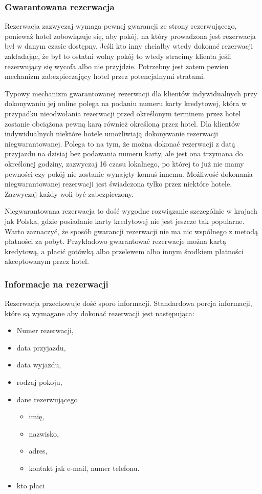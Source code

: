 \documentclass[a4paper,onecolumn,oneside,11pt,wide,floatssmall]{mwrep}
\theoremstyle{definition}
\theoremstyle{plain}%
\theoremstyle{remark}
\begin{document}
\subsubsection{Gwarantowana rezerwacja}
Rezerwacja zazwyczaj wymaga pewnej gwarancji ze strony rezerwującego, ponieważ
hotel zobowiązuje się, aby pokój, na który prowadzona jest rezerwacja
był w danym czasie dostępny. Jeśli kto inny chciałby wtedy dokonać rezerwacji 
zakładając, że był to ostatni wolny pokój to wtedy stracimy klienta jeśli 
rezerwujący się wycofa albo nie przyjdzie. Potrzebny jest zatem pewien  
mechanizm zabezpieczający hotel przez potencjalnymi stratami. 

Typowy mechanizm gwarantowanej rezerwacji dla klientów indywidualnych przy dokonywaniu 
jej online polega na podaniu numeru karty kredytowej, która w przypadku 
nieodwołania rezerwacji przed określonym terminem przez hotel zostanie obciążona pewną karą 
również określoną przez hotel. Dla klientów indywidualnych niektóre hotele 
umożliwiają dokonywanie rezerwacji niegwarantowanej. Polega to na tym, 
że można dokonać rezerwacji z datą przyjazdu na dzisiaj bez podawania 
numeru karty, ale jest ona trzymana do określonej godziny, 
zazwyczaj 16 czasu lokalnego, po której to już nie mamy pewności 
czy pokój nie zostanie wynajęty komuś innemu. Możliwość dokonania
niegwarantowanej rezerwacji jest świadczona tylko przez niektóre hotele.
Zazwyczaj każdy woli być zabezpieczony. 

Niegwarantowana rezerwacja to dość wygodne rozwiązanie szczególnie w krajach jak
Polska, gdzie posiadanie karty kredytowej nie jest jeszcze tak popularne. Warto zaznaczyć, że sposób gwarancji rezerwacji 
nie ma nic wspólnego z metodą płatności za pobyt. Przykładowo gwarantować
rezerwacje można kartą kredytową, a płacić gotówką albo przelewem albo innym
środkiem płatności akceptowanym przez hotel.


\subsubsection{Informacje na rezerwacji}
\label{informacje_na_rezerwacji}
Rezerwacja przechowuje dość sporo informacji. Standardowa porcja informacji, 
które są wymagane aby dokonać rezerwacji jest następująca:
\begin{itemize}
  \item Numer rezerwacji,
  \item data przyjazdu,
  \item data wyjazdu,
  \item rodzaj pokoju,
  \item dane rezerwującego
  \begin{itemize}
    \item imię,
    \item nazwisko, 
    \item adres, 
    \item kontakt jak e-mail, numer telefonu.
  \end{itemize} 
  \item kto płaci
\end{itemize}
\end{document}
